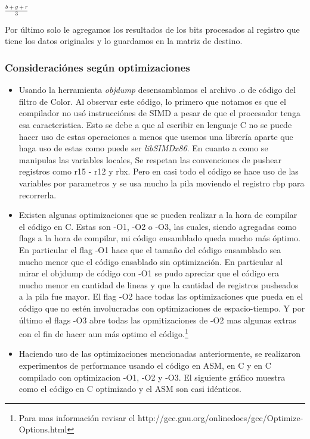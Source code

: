 \begin{center}
 $\frac{b + g + r}{3}$
\end{center}

Por \'ultimo solo le agregamos los resultados de los bits procesados al registro que tiene los datos originales y lo guardamos en la matriz de destino.

\subsubsection{Consideraci\'ones seg\'un optimizaciones}
\begin{itemize}
 \item Usando la herramienta \emph{objdump} desensamblamos el archivo .o de c\'odigo del filtro de Color. Al observar este c\'odigo, lo primero que notamos es
 que el compilador no us\'o instrucci\'ones de SIMD a pesar de que el procesador tenga esa caracteristica. Esto se debe a que al escribir en lenguaje C
no se puede hacer uso de estas operaciones a menos que usemos una librer\'ia aparte que haga uso de estas como puede ser \emph{libSIMDx86}.\newline
En cuanto a como se manipulas las variables locales, Se respetan las convenciones de pushear registros como r15 - r12 y rbx. Pero en casi todo el c\'odigo
se hace uso de las variables por parametros y se usa mucho la pila moviendo el registro rbp para recorrerla.\newline
\item Existen algunas optimizaciones que se pueden realizar a la hora de compilar el c\'odigo en C. Estas son -O1, -O2 o -O3, las cuales, siendo agregadas
como flags a la hora de compilar, mi c\'odigo ensamblado queda mucho m\'as \'optimo. En particular el flag -O1 hace que el tamaño del c\'odigo ensamblado
sea mucho menor que el c\'odigo ensablado sin optimizaci\'on. En particular al mirar el objdump de c\'odigo con -O1 se pudo apreciar que el c\'odigo era
mucho menor en cantidad de lineas y que la cantidad de registros pusheados a la pila fue mayor.\newline
El flag -O2 hace todas las optimizaciones que pueda en el c\'odigo que no est\'en involucradas con optimizaciones de espacio-tiempo. Y por \'ultimo el flags
-O3 abre todas las opmitizaciones de -O2 mas algunas extras con el fin de hacer aun m\'as optimo el c\'odigo.\footnote{Para mas informaci\'on revisar el
http://gcc.gnu.org/onlinedocs/gcc/Optimize-Options.html}\newline
\item Haciendo uso de las optimizaciones mencionadas anteriormente, se realizaron experimentos de performance usando el c\'odigo en ASM, en C y en C 
compilado con optimizacion -O1, -O2 y -O3. El siguiente gr\'afico muestra como el c\'odigo en C optimizado y el ASM son casi id\'enticos.


\end{itemize}
